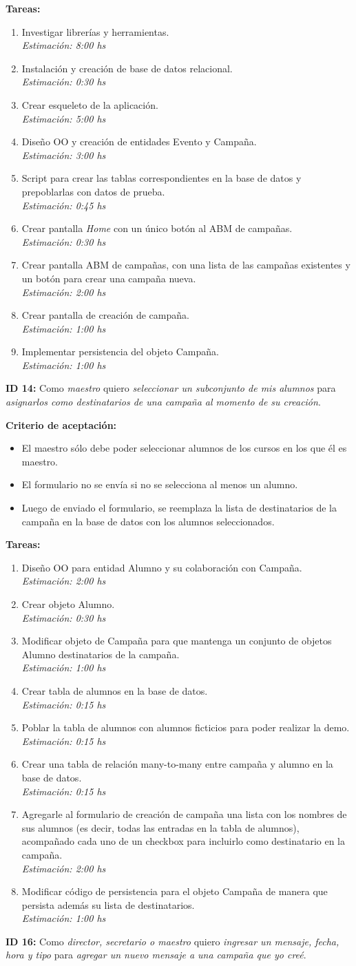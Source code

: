 \documentclass[a4paper, 10pt, twoside]{article}
\newcommand{\sprintstory}[4]{
  \noindent
  \textbf{ID #1:} Como \emph{#2} quiero \emph{#3} para \emph{#4}.
}
\newenvironment{criterios}{
  \textbf{Criterio de aceptación:}
  \begin{itemize}
}{
  \end{itemize}
}
\newcommand{\criterio}[1] {
  \item #1
}
\newenvironment{tasks}{
  \textbf{Tareas:}
  \begin{enumerate}
}{
  \end{enumerate}
}
\newcommand{\task}[2] {
  \item #1.\\
  \emph{Estimación: #2 hs}
}
\begin{document}
\begin{tasks}
  \task{Investigar librerías y herramientas}{8:00}
  \task{Instalación y creación de base de datos relacional}{0:30}
  \task{Crear esqueleto de la aplicación}{5:00}
  \task{Diseño OO y creación de entidades Evento y Campaña}{3:00}
  \task{Script para crear las tablas correspondientes en la base de datos y prepoblarlas con datos de prueba}{0:45}
  \task{Crear pantalla \emph{Home} con un único botón al ABM de campañas}{0:30}
  \task{Crear pantalla ABM de campañas, con una lista de las campañas existentes y un botón para crear una campaña nueva}{2:00}
  \task{Crear pantalla de creación de campaña}{1:00}
  \task{Implementar persistencia del objeto Campaña}{1:00}
\end{tasks}


\sprintstory{14}
            {maestro}
            {seleccionar un subconjunto de mis alumnos}
            {asignarlos como destinatarios de una campaña al momento de su creación}

\begin{criterios}
  \criterio{El maestro sólo debe poder seleccionar alumnos de los cursos en los que él es maestro.}
  \criterio{El formulario no se envía si no se selecciona al menos un alumno.}
  \criterio{Luego de enviado el formulario, se reemplaza la lista de destinatarios de la campaña en la base de datos con los alumnos seleccionados.}
\end{criterios}

\begin{tasks}
  \task{Diseño OO para entidad Alumno y su colaboración con Campaña}{2:00}
  \task{Crear objeto Alumno}{0:30}
  \task{Modificar objeto de Campaña para que mantenga un conjunto de objetos Alumno destinatarios de la campaña}{1:00}
  \task{Crear tabla de alumnos en la base de datos}{0:15}
  \task{Poblar la tabla de alumnos con alumnos ficticios para poder realizar la demo}{0:15}
  \task{Crear una tabla de relación many-to-many entre campaña y alumno en la base de datos}{0:15}
  \task{Agregarle al formulario de creación de campaña una lista con los nombres de sus alumnos (es decir, todas las entradas en la tabla de alumnos), acompañado cada uno de un checkbox para incluirlo como destinatario en la campaña}{2:00}
  \task{Modificar código de persistencia para el objeto Campaña de manera que persista además su lista de destinatarios}{1:00}
\end{tasks}


\sprintstory{16}
            {director, secretario o maestro}
            {ingresar un mensaje, fecha, hora y tipo}
            {agregar un nuevo mensaje a una campaña que yo creé}
\end{document}
